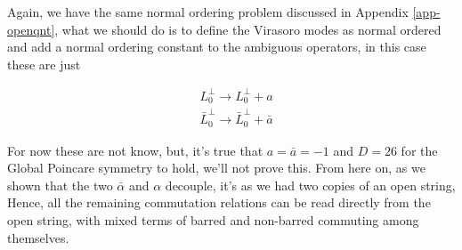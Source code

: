 Again, we have the same normal ordering problem discussed in Appendix \ref{app-openqnt}, what we should do is to define the Virasoro modes as normal ordered and add a normal 
ordering constant to the ambiguous operators, in this case these are just

\begin{align*}
    &L^\perp_0\rightarrow L_0^\perp+a\\
    &{\bar L}^\perp_0\rightarrow {\bar L}_0^\perp+\bar a
\end{align*}

For now these are not know, but, it's true that $a=\bar a=-1$ and $D=26$ for the Global Poincare symmetry to hold, we'll not prove this. From here on, as we shown that the two $\bar\alpha$ and 
$\alpha$ decouple, it's as we had two copies of an open string, Hence, all the remaining commutation relations can be read directly from the open string, with mixed terms of barred and non-barred 
commuting among themselves.